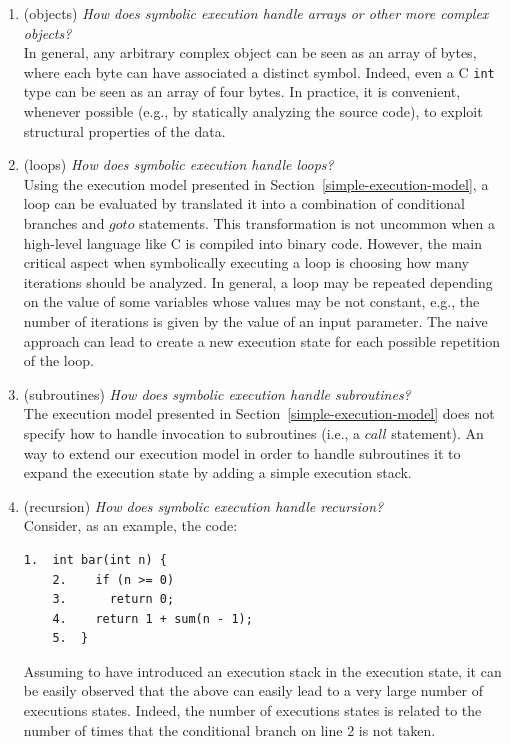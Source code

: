 \documentclass[10pt, a4paper]{article}
\begin{document}
\begin{enumerate}

  \item (objects) {\em How does symbolic execution handle arrays or other more complex objects?} \\
  In general, any arbitrary complex object can be seen as an array of bytes, where each byte can have associated a distinct symbol. Indeed, even a C {\tt int} type can be seen as an array of four bytes. In practice, it is convenient, whenever possible (e.g., by statically analyzing the source code), to exploit structural properties of the data. 

  \item (loops) {\em How does symbolic execution handle loops?} \\
  Using the execution model presented in Section~\ref{simple-execution-model}, a loop can be evaluated by translated it into a combination of conditional branches and $goto$ statements. This transformation is not uncommon when a high-level language like C is compiled into binary code. However, the main critical aspect when symbolically executing a loop is choosing how many iterations should be analyzed. In general, a loop may be repeated depending on the value of some variables whose values may be not constant, e.g., the number of iterations is given by the value of an input parameter. The naive approach can lead to create a new execution state for each possible repetition of the loop.

  \item (subroutines) {\em How does symbolic execution handle subroutines?} \\
  The execution model presented in Section~\ref{simple-execution-model} does not specify how to handle invocation to subroutines (i.e., a $call$ statement). An way to extend our execution model in order to handle subroutines it to expand the execution state by adding a simple execution stack.

  \item (recursion) {\em How does symbolic execution handle recursion?} \\
  Consider, as an example, the code:
    \begin{lstlisting}[basicstyle=\ttfamily\small]
    1.  int bar(int n) {
    2.    if (n >= 0) 
    3.      return 0;
    4.    return 1 + sum(n - 1);
    5.  }
    \end{lstlisting}
  Assuming to have introduced an execution stack in the execution state, it can be easily observed that the above can easily lead to a very large number of executions states. Indeed, the number of executions states is related to the number of times that the conditional branch on line 2 is not taken. 


\end{enumerate}
\end{document}
